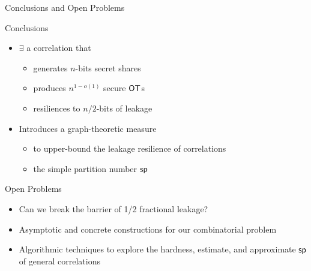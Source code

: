 \begin{frame}{Conclusions and Open Problems}

	{
	\begin{block}{Conclusions}
		\begin{itemize}
			\item $ \exists $ a correlation that  
			\begin{itemize}
				\item generates $ n $-bits secret shares
				\item  produces $ n^{1-o(1)} $ secure $\OT$s
				\item resiliences to $ n/2 $-bits of leakage 
			\end{itemize}
			\item Introduces a graph-theoretic measure 
			\begin{itemize}
				\item to upper-bound the leakage resilience of correlations
				\item the simple partition number $ \mathsf{sp} $ 
			\end{itemize}
		\end{itemize}
	\end{block}
	}
	\pause

	{
	\begin{block}{Open Problems}
		\begin{itemize}
			\item Can we break the barrier of 1/2 fractional leakage?
			\item Asymptotic and concrete constructions for our combinatorial problem
			\item Algorithmic techniques to explore the hardness, estimate, and approximate $ \mathsf{sp} $ of general correlations
		\end{itemize}		
	\end{block}
	}
\end{frame}